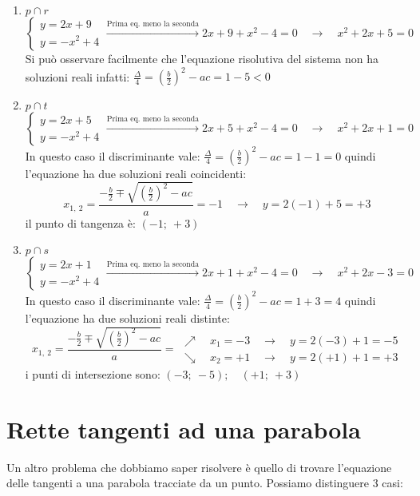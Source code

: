 \begin{enumerate}
 \item $p \cap r$
\[\left\{\begin{array}{l}
  y=2x+9\\
  y=-x^2+4
\end{array}\right. \xrightarrow{\text{Prima eq. meno la seconda}}
2x+9+x^2-4=0 \quad \rightarrow \quad x^2+2x+5=0\]
 Si può osservare facilmente che l'equazione risolutiva del sistema non ha 
 soluzioni reali infatti: 
 $\frac{\Delta}{4}=\left(\frac{b}{2}\right)^2-ac= 1-5 < 0$
 \item $p \cap t$
\[\left\{\begin{array}{l}
  y=2x+5\\
  y=-x^2+4
\end{array}\right. \xrightarrow{\text{Prima eq. meno la seconda}}
2x+5+x^2-4=0 \quad \rightarrow \quad x^2+2x+1=0\]
 In questo caso il discriminante vale: 
 $\frac{\Delta}{4}=\left(\frac{b}{2}\right)^2-ac= 1-1 = 0$
 quindi l'equazione ha due soluzioni reali coincidenti:
 \[x_{1,~2}=\frac{-\frac{b}{2} \mp \sqrt{\left(\frac{b}{2}\right)^2-ac}}{a}=
 -1 \quad \rightarrow \quad y=2(-1)+5=+3\]
 il punto di tangenza è: $(-1;~+3)$
 \item $p \cap s$
\[\left\{\begin{array}{l}
  y=2x+1\\
  y=-x^2+4
\end{array}\right. \xrightarrow{\text{Prima eq. meno la seconda}}
2x+1+x^2-4=0 \quad \rightarrow \quad x^2+2x-3=0\]
 In questo caso il discriminante vale: 
 $\frac{\Delta}{4}=\left(\frac{b}{2}\right)^2-ac= 1+3 = 4$
 quindi l'equazione ha due soluzioni reali distinte:
 \[x_{1,~2}=\frac{-\frac{b}{2} \mp \sqrt{\left(\frac{b}{2}\right)^2-ac}}{a}=
 \begin{array}{l}
  \nearrow \quad x_1=-3 \quad \rightarrow \quad y=2(-3)+1=-5\\
  \searrow \quad x_2=+1 \quad \rightarrow \quad y=2(+1)+1=+3
 \end{array}\]
 i punti di intersezione sono: $(-3;~-5); \quad (+1;~+3)$
\end{enumerate}

\section{Rette tangenti ad una parabola}
\label{sec:parabola_altreparabole}

Un altro problema che dobbiamo saper risolvere è quello di trovare l'equazione 
delle tangenti a una parabola tracciate da un punto. Possiamo distinguere 3 casi:


